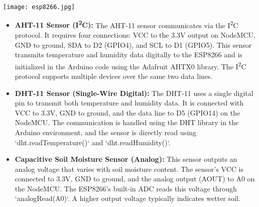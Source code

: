 \documentclass[12pt,a4paper]{article}
\begin{document}
\vspace{0.5cm}
\begin{center}
    \texttt{[image: esp8266.jpg]}
\end{center}

\begin{itemize}
    \item \textbf{AHT-11 Sensor (I\textsuperscript{2}C):}  
    The AHT-11 sensor communicates via the I\textsuperscript{2}C protocol. It requires four connections: VCC to the 3.3V output on NodeMCU, GND to ground, SDA to D2 (GPIO4), and SCL to D1 (GPIO5). This sensor transmits temperature and humidity data digitally to the ESP8266 and is initialized in the Arduino code using the Adafruit AHTX0 library. The I\textsuperscript{2}C protocol supports multiple devices over the same two data lines.

    \item \textbf{DHT-11 Sensor (Single-Wire Digital):}  
    The DHT-11 uses a single digital pin to transmit both temperature and humidity data. It is connected with VCC to 3.3V, GND to ground, and the data line to D5 (GPIO14) on the NodeMCU. The communication is handled using the DHT library in the Arduino environment, and the sensor is directly read using `dht.readTemperature()` and `dht.readHumidity()`.

    \item \textbf{Capacitive Soil Moisture Sensor (Analog):}  
    This sensor outputs an analog voltage that varies with soil moisture content. The sensor's VCC is connected to 3.3V, GND to ground, and the analog output (AOUT) to A0 on the NodeMCU. The ESP8266's built-in ADC reads this voltage through `analogRead(A0)`. A higher output voltage typically indicates wetter soil.
\end{itemize}

\vspace{0.5cm}
\end{document}
